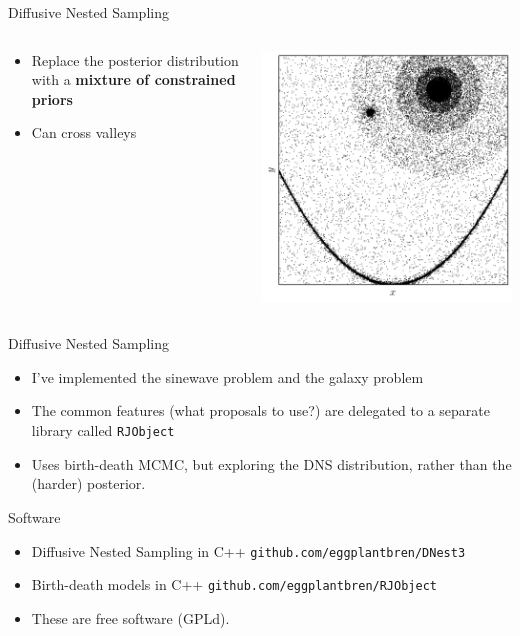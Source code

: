 \begin{frame}[t]{Diffusive Nested Sampling}
\begin{columns}[T]
\begin{column}{0.35\textwidth}
  \vspace{30pt}
  \begin{itemize}
  \setlength{\itemsep}{20pt}
  \item Replace the posterior distribution with a {\bf mixture of constrained priors}
  \item Can cross valleys
  \end{itemize}
\end{column}
\hfill
\begin{column}{0.5\textwidth}
  \hspace{50pt}
  \includegraphics[scale=0.4]{dnest.png}
\end{column}
\end{columns}
\end{frame}

\begin{frame}[t]{Diffusive Nested Sampling}
\begin{itemize}
\setlength{\itemsep}{20pt}
\item I've implemented the sinewave problem and the galaxy problem
\item The common features (what proposals to use?) are delegated to
a separate library called {\tt RJObject}
\item Uses birth-death MCMC, but exploring the DNS distribution, rather than
the (harder) posterior.
\end{itemize}
\end{frame}


\begin{frame}[t]{Software}
\begin{itemize}
\setlength{\itemsep}{20pt}
\item Diffusive Nested Sampling in C++
{\tt github.com/eggplantbren/DNest3}
\item Birth-death models in C++
{\tt github.com/eggplantbren/RJObject}
\item These are free software (GPLd).
\end{itemize}
\end{frame}

